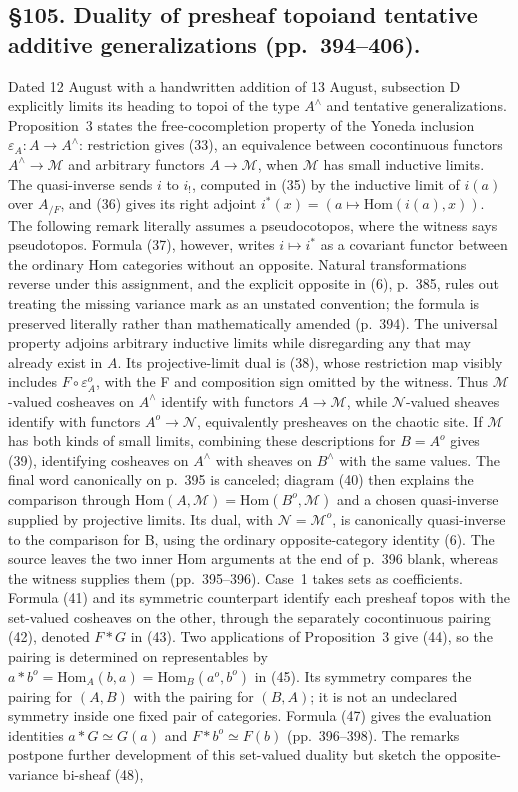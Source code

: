 \documentclass[10pt,oneside]{book}
\begin{document}
\subsection*{\S105. Duality of presheaf topoi\newline and tentative additive generalizations (pp.\ 394--406).}
Dated 12 August with a handwritten addition of 13 August, subsection D explicitly limits its heading to topoi of the type $A^\wedge$ and tentative generalizations. Proposition~3 states the free-cocompletion property of the Yoneda inclusion $\varepsilon_A:A\to A^\wedge$: restriction gives (33), an equivalence between cocontinuous functors $A^\wedge\to\mathcal M$ and arbitrary functors $A\to\mathcal M$, when $\mathcal M$ has small inductive limits. The quasi-inverse sends $i$ to $i_!$, computed in (35) by the inductive limit of $i(a)$ over $A_{/F}$, and (36) gives its right adjoint $i^*(x)=(a\mapsto\mathrm{Hom}(i(a),x))$. The following remark literally assumes a pseudocotopos, where the witness says pseudotopos. Formula (37), however, writes $i\mapsto i^*$ as a covariant functor between the ordinary Hom categories without an opposite. Natural transformations reverse under this assignment, and the explicit opposite in (6), p.\ 385, rules out treating the missing variance mark as an unstated convention; the formula is preserved literally rather than mathematically amended (p.\ 394). The universal property adjoins arbitrary inductive limits while disregarding any that may already exist in $A$. Its projective-limit dual is (38), whose restriction map visibly includes $F\circ\varepsilon_A^o$, with the F and composition sign omitted by the witness. Thus $\mathcal M$-valued cosheaves on $A^\wedge$ identify with functors $A\to\mathcal M$, while $\mathcal N$-valued sheaves identify with functors $A^o\to\mathcal N$, equivalently presheaves on the chaotic site. If $\mathcal M$ has both kinds of small limits, combining these descriptions for $B=A^o$ gives (39), identifying cosheaves on $A^\wedge$ with sheaves on $B^\wedge$ with the same values. The final word canonically on p.\ 395 is canceled; diagram (40) then explains the comparison through $\mathrm{Hom}(A,\mathcal M)=\mathrm{Hom}(B^o,\mathcal M)$ and a chosen quasi-inverse supplied by projective limits. Its dual, with $\mathcal N=\mathcal M^o$, is canonically quasi-inverse to the comparison for B, using the ordinary opposite-category identity (6). The source leaves the two inner Hom arguments at the end of p.\ 396 blank, whereas the witness supplies them (pp.\ 395--396). Case~1 takes sets as coefficients. Formula (41) and its symmetric counterpart identify each presheaf topos with the set-valued cosheaves on the other, through the separately cocontinuous pairing (42), denoted $F*G$ in (43). Two applications of Proposition~3 give (44), so the pairing is determined on representables by $a*b^o=\mathrm{Hom}_A(b,a)=\mathrm{Hom}_B(a^o,b^o)$ in (45). Its symmetry compares the pairing for $(A,B)$ with the pairing for $(B,A)$; it is not an undeclared symmetry inside one fixed pair of categories. Formula (47) gives the evaluation identities $a*G\simeq G(a)$ and $F*b^o\simeq F(b)$ (pp.\ 396--398). The remarks postpone further development of this set-valued duality but sketch the opposite-variance bi-sheaf (48), 
\end{document}
